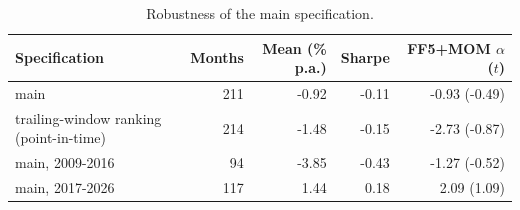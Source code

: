 \begin{table}[htbp]\centering\small
\caption{Robustness of the main specification.}\label{tab:robustness}
\begin{tabular}{lrrrr}\toprule
Specification & Months & Mean (\% p.a.) & Sharpe & FF5+MOM $\alpha$ ($t$) \\ \midrule
main & 211 & -0.92 & -0.11 & -0.93 (-0.49) \\
trailing-window ranking (point-in-time) & 214 & -1.48 & -0.15 & -2.73 (-0.87) \\
main, 2009-2016 & 94 & -3.85 & -0.43 & -1.27 (-0.52) \\
main, 2017-2026 & 117 & 1.44 & 0.18 & 2.09 (1.09) \\
\bottomrule\end{tabular}\end{table}

